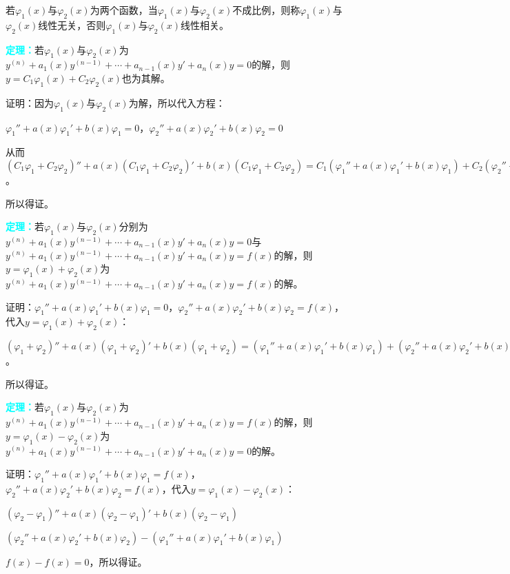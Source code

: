 \documentclass[UTF8, 12pt]{ctexart}
\begin{document}
若$\varphi_1(x)$与$\varphi_2(x)$为两个函数，当$\varphi_1(x)$与$\varphi_2(x)$不成比例，则称$\varphi_1(x)$与$\varphi_2(x)$线性无关，否则$\varphi_1(x)$与$\varphi_2(x)$线性相关。

\textcolor{aqua}{\textbf{定理：}}若$\varphi_1(x)$与$\varphi_2(x)$为$y^{(n)}+a_1(x)y^{(n-1)}+\cdots+a_{n-1}(x)y'+a_n(x)y=0$的解，则$y=C_1\varphi_1(x)+C_2\varphi_2(x)$也为其解。

证明：因为$\varphi_1(x)$与$\varphi_2(x)$为解，所以代入方程：

$\varphi_1''+a(x)\varphi_1'+b(x)\varphi_1=0$，$\varphi_2''+a(x)\varphi_2'+b(x)\varphi_2=0$

从而$(C_1\varphi_1+C_2\varphi_2)''+a(x)(C_1\varphi_1+C_2\varphi_2)'+b(x)(C_1\varphi_1+C_2\varphi_2)=C_1(\varphi_1''+a(x)\varphi_1'+b(x)\varphi_1)+C_2(\varphi_2''+a(x)\varphi_2'+b(x)\varphi_2)=0$。

所以得证。

\textcolor{aqua}{\textbf{定理：}}若$\varphi_1(x)$与$\varphi_2(x)$分别为$y^{(n)}+a_1(x)y^{(n-1)}+\cdots+a_{n-1}(x)y'+a_n(x)y=0$与$y^{(n)}+a_1(x)y^{(n-1)}+\cdots+a_{n-1}(x)y'+a_n(x)y=f(x)$的解，则$y=\varphi_1(x)+\varphi_2(x)$为$y^{(n)}+a_1(x)y^{(n-1)}+\cdots+a_{n-1}(x)y'+a_n(x)y=f(x)$的解。

证明：$\varphi_1''+a(x)\varphi_1'+b(x)\varphi_1=0$，$\varphi_2''+a(x)\varphi_2'+b(x)\varphi_2=f(x)$，代入$y=\varphi_1(x)+\varphi_2(x)$：

$(\varphi_1+\varphi_2)''+a(x)(\varphi_1+\varphi_2)'+b(x)(\varphi_1+\varphi_2)=(\varphi_1''+a(x)\varphi_1'+b(x)\varphi_1)+(\varphi_2''+a(x)\varphi_2'+b(x)\varphi_2)=f(x)$。

所以得证。

\textcolor{aqua}{\textbf{定理：}}若$\varphi_1(x)$与$\varphi_2(x)$为$y^{(n)}+a_1(x)y^{(n-1)}+\cdots+a_{n-1}(x)y'+a_n(x)y=f(x)$的解，则$y=\varphi_1(x)-\varphi_2(x)$为$y^{(n)}+a_1(x)y^{(n-1)}+\cdots+a_{n-1}(x)y'+a_n(x)y=0$的解。

证明：$\varphi_1''+a(x)\varphi_1'+b(x)\varphi_1=f(x)$，$\varphi_2''+a(x)\varphi_2'+b(x)\varphi_2=f(x)$，代入$y=\varphi_1(x)-\varphi_2(x)$：

$(\varphi_2-\varphi_1)''+a(x)(\varphi_2-\varphi_1)'+b(x)(\varphi_2-\varphi_1)$

$(\varphi_2''+a(x)\varphi_2'+b(x)\varphi_2)-(\varphi_1''+a(x)\varphi_1'+b(x)\varphi_1)$

$f(x)-f(x)=0$，所以得证。
\end{document}

